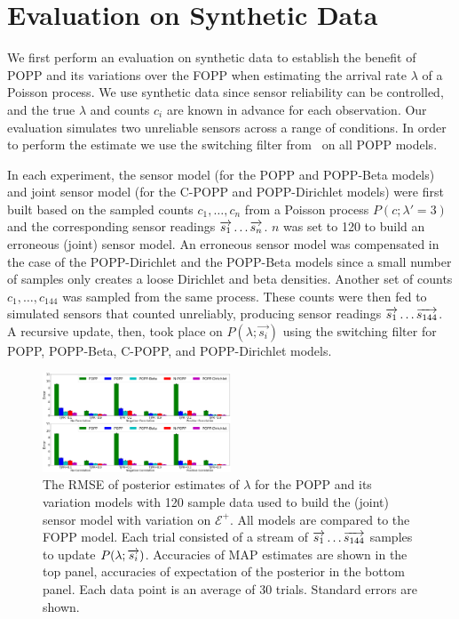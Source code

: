 
\section{Evaluation on Synthetic Data}
\label{sec:evasim}

We first perform an evaluation on synthetic data  to establish the benefit of POPP and its variations over the FOPP when estimating the arrival rate $\lambda$ of a Poisson process. We use synthetic data since sensor reliability can be controlled, and the true $\lambda$ and counts $c_i$ are known in advance for each observation. Our evaluation simulates two unreliable sensors across a range of conditions. In order to perform the estimate we use the switching filter from~\cite{jovan18a} on all POPP models.

In each experiment, the sensor model (for the POPP and POPP-Beta models) and joint sensor model (for the C-POPP and POPP-Dirichlet models) were first built based on the sampled counts $c_1, \ldots, c_n$ from a Poisson process $P(c ; \lambda'=3)$ and the corresponding sensor readings $\protect\overrightarrow{s_1} \ldots \protect\overrightarrow{s_{n}}$. $n$ was set to 120 to build an erroneous (joint) sensor model. An erroneous sensor model was compensated in the case of the POPP-Dirichlet and the POPP-Beta models since a small number of samples only creates a loose Dirichlet and beta densities. Another set of counts $c_1, \ldots, c_{144}$ was sampled from the same process. These counts were then fed to simulated sensors that counted unreliably, producing sensor readings $\protect\overrightarrow{s_1} \ldots \protect\overrightarrow{s_{144}}$. A recursive update, then, took place on $P(\lambda ; \overrightarrow{s_i})$ using the switching filter for POPP, POPP-Beta, C-POPP, and POPP-Dirichlet models.

\begin{figure}[t!]
	\centering
	\includegraphics[width=0.5\textwidth]{./figures/tjpr_comparison_120.png}
    \caption{The RMSE of posterior estimates of $\lambda$ for the POPP and its variation models with 120 sample data used to build the (joint) sensor model with variation on $\mathcal{E^+}$. All models are compared to the FOPP model. Each trial consisted of a stream of $\protect\overrightarrow{s_1} \ldots \protect\overrightarrow{s_{144}}$ samples to update $P(\lambda ; \protect\overrightarrow{s_i})$. Accuracies of MAP estimates are shown in the top panel, accuracies of expectation of the posterior in the bottom panel. Each data point is an average of 30 trials. Standard errors are shown.} 
	\label{fig:tjpr_comparison_120}
\end{figure}

